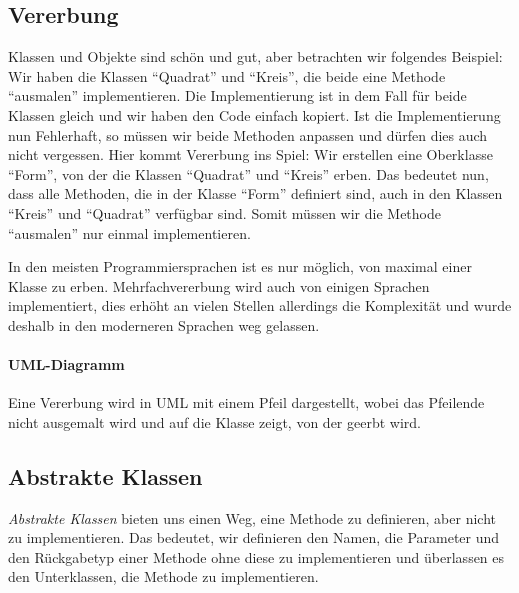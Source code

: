 \subsection{Vererbung} \imperativeMark \oopMark

	Klassen und Objekte sind schön und gut, aber betrachten wir folgendes Beispiel: Wir haben die Klassen \enquote{Quadrat} und \enquote{Kreis}, die beide eine Methode \enquote{ausmalen} implementieren. Die Implementierung ist in dem Fall für beide Klassen gleich und wir haben den Code einfach kopiert. Ist die Implementierung nun Fehlerhaft, so müssen wir beide Methoden anpassen und dürfen dies auch nicht vergessen. Hier kommt Vererbung ins Spiel: Wir erstellen eine Oberklasse \enquote{Form}, von der die Klassen \enquote{Quadrat} und \enquote{Kreis} erben. Das bedeutet nun, dass alle Methoden, die in der Klasse \enquote{Form} definiert sind, auch in den Klassen \enquote{Kreis} und \enquote{Quadrat} verfügbar sind. Somit müssen wir die Methode \enquote{ausmalen} nur einmal implementieren.
	
	In den meisten Programmiersprachen ist es nur möglich, von maximal einer Klasse zu erben. Mehrfachvererbung wird auch von einigen Sprachen implementiert, dies erhöht an vielen Stellen allerdings die Komplexität und wurde deshalb in den moderneren Sprachen weg gelassen.
	
	\paragraph{UML-Diagramm}
		Eine Vererbung wird in UML mit einem Pfeil dargestellt, wobei das Pfeilende nicht ausgemalt wird und auf die Klasse zeigt, von der geerbt wird.
		\begin{figure}[H]
			\centering
		\end{figure}

\subsection{Abstrakte Klassen} \imperativeMark \oopMark

	\textit{Abstrakte Klassen} bieten uns einen Weg, eine Methode zu definieren, aber nicht zu implementieren. Das bedeutet, wir definieren den Namen, die Parameter und den Rückgabetyp einer Methode ohne diese zu implementieren und überlassen es den Unterklassen, die Methode zu implementieren.
	
